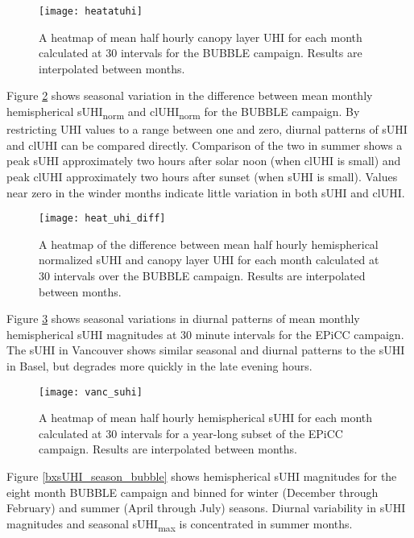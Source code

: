 \begin{bibunit}
\begin{figure}[H]
	\centering
	\texttt{[image: heatatuhi]}
	\caption{A heatmap of mean half hourly canopy layer UHI for each month calculated at 30 \si{\min} intervals for the BUBBLE campaign. Results are interpolated between months.}
	\label{heatcluhi}
\end{figure}

Figure \ref{heat_uhi_diff} shows seasonal variation in the difference between mean monthly hemispherical sUHI\textsubscript{norm} and clUHI\textsubscript{norm} for the BUBBLE campaign. By restricting UHI values to a range between one and zero, diurnal patterns of sUHI and clUHI can be compared directly. Comparison of the two in summer shows a peak sUHI approximately two hours after solar noon (when clUHI is small) and peak clUHI approximately two hours after sunset (when sUHI is small). Values near zero in the winder months indicate little variation in both sUHI and clUHI.

\begin{figure}[H]
	\centering
	\texttt{[image: heat\_uhi\_diff]}
	\caption{A heatmap of the difference between mean half hourly hemispherical normalized sUHI and canopy layer UHI for each month calculated at 30 \si{\min} intervals over the BUBBLE campaign. Results are interpolated between months.}
	\label{heat_uhi_diff}
\end{figure}

Figure \ref{vanc_suhi} shows seasonal variations in diurnal patterns of mean monthly hemispherical sUHI magnitudes at 30 minute intervals for the EPiCC campaign. The sUHI in Vancouver shows similar seasonal and diurnal patterns to the sUHI in Basel, but degrades more quickly in the late evening hours.

\begin{figure}[H]
	\centering
	\texttt{[image: vanc\_suhi]}
	\caption{A heatmap of mean half hourly hemispherical sUHI for each month calculated at 30 \si{\min} intervals for a year-long subset of the EPiCC campaign. Results are interpolated between months.}
	\label{vanc_suhi}
\end{figure}

Figure \ref{bxsUHI_season_bubble} shows hemispherical sUHI magnitudes for the eight month BUBBLE campaign and binned for winter (December through February) and summer (April through July) seasons. Diurnal variability in sUHI magnitudes and seasonal sUHI\textsubscript{max} is concentrated in summer months. 


\end{bibunit}
